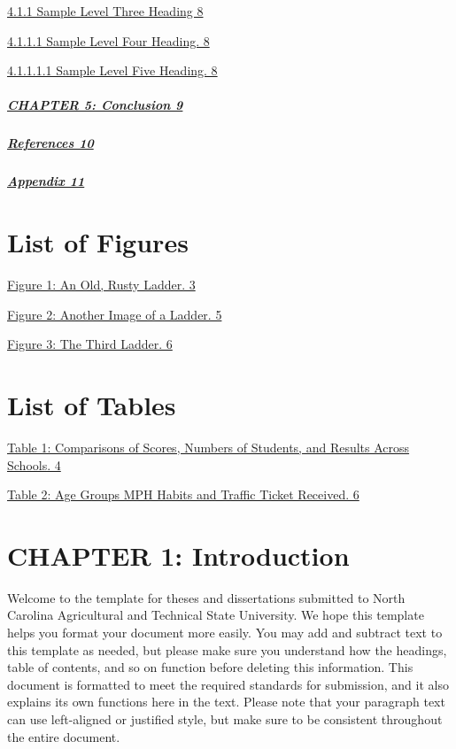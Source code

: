 \protect\hyperlink{_Toc114562031}{4.1.1 Sample Level Three Heading 8}

\protect\hyperlink{_Toc114562032}{4.1.1.1 Sample Level Four Heading. 8}

\protect\hyperlink{_Toc114562033}{4.1.1.1.1 Sample Level Five Heading.
8}

\hypertarget{chapter-5-conclusion-9}{%
\subparagraph{\texorpdfstring{\protect\hyperlink{chapter-5-conclusion}{CHAPTER
5: Conclusion
9}}{CHAPTER 5: Conclusion 9}}\label{chapter-5-conclusion-9}}

\hypertarget{references-10}{%
\subparagraph{\texorpdfstring{\protect\hyperlink{references}{References
10}}{References 10}}\label{references-10}}

\hypertarget{appendix-11}{%
\subparagraph{\texorpdfstring{\protect\hyperlink{appendix}{Appendix
11}}{Appendix 11}}\label{appendix-11}}

\hypertarget{list-of-figures}{%
\section{\texorpdfstring{\hfill\break
List of Figures}{ List of Figures}}\label{list-of-figures}}

\protect\hyperlink{_Toc114562037}{Figure 1: An Old, Rusty Ladder. 3}

\protect\hyperlink{_Toc114562038}{Figure 2: Another Image of a Ladder.
5}

\protect\hyperlink{_Toc114562039}{Figure 3: The Third Ladder. 6}

\hypertarget{list-of-tables}{%
\section{\texorpdfstring{\hfill\break
List of Tables}{ List of Tables}}\label{list-of-tables}}

\protect\hyperlink{_Toc111537318}{Table 1: Comparisons of Scores,
Numbers of Students, and Results Across Schools. 4}

\protect\hyperlink{_Toc111537319}{Table 2: Age Groups MPH Habits and
Traffic Ticket Received. 6}

\hypertarget{chapter-1-introduction}{%
\section{CHAPTER 1: Introduction}\label{chapter-1-introduction}}

Welcome to the template for theses and dissertations submitted to North
Carolina Agricultural and Technical State University. We hope this
template helps you format your document more easily. You may add and
subtract text to this template as needed, but please make sure you
understand how the headings, table of contents, and so on function
before deleting this information. This document is formatted to meet the
required standards for submission, and it also explains its own
functions here in the text. Please note that your paragraph text can use
left-aligned or justified style, but make sure to be consistent
throughout the entire document.

